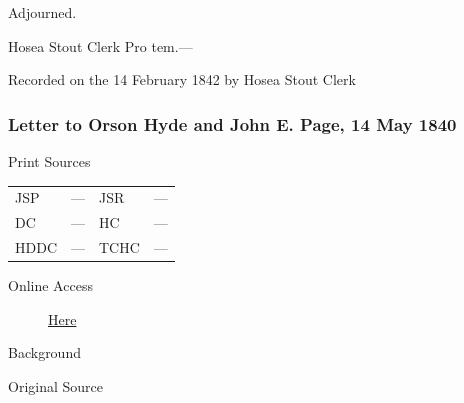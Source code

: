 				Adjourned.

				\begin{tightright}
					Hosea Stout Clerk Pro tem.---
				\end{tightright}

				Recorded on the 14 February 1842 by Hosea Stout Clerk
				
		\subsubsection{Letter to Orson Hyde and John E. Page, 14 May 1840}
			\label{EMS-1840-JS-14-MAY-1840}
			
			\begin{description}
				\item[Print Sources]
			\end{description}

			\begin{tabular}{p{0.5in}p{1in}p{0.5in}p{1in}}
				JSP	 	& ---		& JSR 		& --- \\
				DC	 	& ---		& HC 		& --- \\
				HDDC 	& ---		& TCHC 		& --- \\
			\end{tabular}
			
			\begin{description}
				\item[Online Access] \href{https://www.josephsmithpapers.org/paper-summary/letter-to-orson-hyde-and-john-e-page-14-may-1840/1}{Here}
			\end{description}
			
			\begin{description}
				\item[Background]
			\end{description}
			
			
			\begin{description}
				\item[Original Source]
			\end{description}
			
